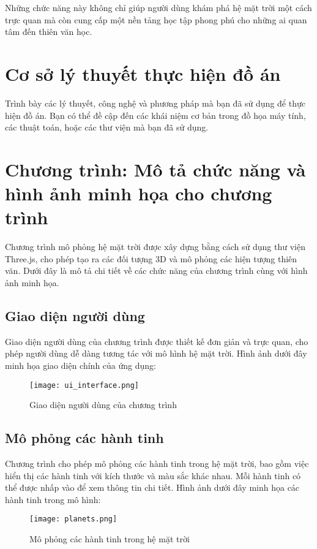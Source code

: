 \documentclass[14pt]{extarticle}
\begin{document}
Những chức năng này không chỉ giúp người dùng khám phá hệ mặt trời một cách trực quan mà còn cung cấp một nền tảng học tập phong phú cho những ai quan tâm đến thiên văn học.
\section{Cơ sở lý thuyết thực hiện đồ án}
Trình bày các lý thuyết, công nghệ và phương pháp mà bạn đã sử dụng để thực hiện đồ án. Bạn có thể đề cập đến các khái niệm cơ bản trong đồ họa máy tính, các thuật toán, hoặc các thư viện mà bạn đã sử dụng.
\section{Chương trình: Mô tả chức năng và hình ảnh minh họa cho chương trình}
Chương trình mô phỏng hệ mặt trời được xây dựng bằng cách sử dụng thư viện Three.js, cho phép tạo ra các đối tượng 3D và mô phỏng các hiện tượng thiên văn. Dưới đây là mô tả chi tiết về các chức năng của chương trình cùng với hình ảnh minh họa.

\subsection{Giao diện người dùng}
Giao diện người dùng của chương trình được thiết kế đơn giản và trực quan, cho phép người dùng dễ dàng tương tác với mô hình hệ mặt trời. Hình ảnh dưới đây minh họa giao diện chính của ứng dụng:

\begin{figure}[h]
    \centering
    \texttt{[image: ui\_interface.png]}
    \caption{Giao diện người dùng của chương trình}
    \label{fig:ui_interface}
\end{figure}

\subsection{Mô phỏng các hành tinh}
Chương trình cho phép mô phỏng các hành tinh trong hệ mặt trời, bao gồm việc hiển thị các hành tinh với kích thước và màu sắc khác nhau. Mỗi hành tinh có thể được nhấp vào để xem thông tin chi tiết. Hình ảnh dưới đây minh họa các hành tinh trong mô hình:

\begin{figure}[h]
    \centering
    \texttt{[image: planets.png]}
    \caption{Mô phỏng các hành tinh trong hệ mặt trời}
    \label{fig:planets}
\end{figure}
\end{document}
